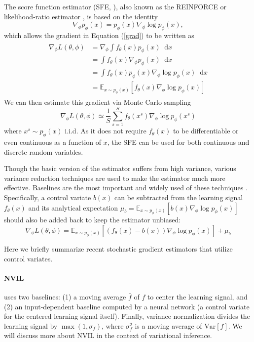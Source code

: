 \documentclass[11pt,a4paper]{article}
\newcommand*\diff{\mathop{}\!\mathrm{d}}
\begin{document}
The score function estimator (SFE, \cite{fu2006gradient}), also known as the REINFORCE \citep{williams1992simple} or likelihood-ratio estimator \citep{glynn1990likelihood}, is based on the identity 
\begin{equation}
    \nabla_\phi p_\phi(x) = p_\phi(x) \nabla_\phi \log p_\phi(x) ,
\end{equation}
which allows the gradient in Equation (\ref{grad}) to be written as 
\begin{align}
\begin{split}
    \nabla_\phi L(\theta, \phi) & = \nabla_\phi \int f_\theta(x) p_\phi(x) \diff x \\
    & = \int f_\theta(x) \nabla_\phi p_\phi(x) \diff x \\
    & = \int f_\theta(x) p_\phi(x) \nabla_\phi \log p_\phi(x) \diff x \\
    & = \mathbb{E}_{x\sim p_\phi(x)}[f_\theta(x) \nabla_\phi \log p_\phi(x)]
\end{split}
\end{align}
We can then estimate this gradient via Monte Carlo sampling
\begin{equation}
    \nabla_\phi L(\theta, \phi) \simeq \frac{1}{S} \sum_{s=1}^{S} f_\theta(x^{s}) \nabla_\phi \log p_\phi(x^{s})
\end{equation}
where $x^{s} \sim p_\phi(x)$ i.i.d. As it does not require $f_\theta(x)$ to be differentiable or even continuous as a function of $x$, the SFE can be used for both continuous and discrete random variables.

Though the basic version of the estimator suffers from high variance, various variance reduction techniques are used to make the estimator much more effective. Baselines are the most important and widely used of these techniques \citep{williams1992simple}. Specifically, a control variate $b(x)$ can be subtracted from the learning signal $f_\theta(x)$ and its analytical expectation $\mu_b = \mathbb{E}_{x\sim p_\phi(x)}[b(x)\nabla_\phi \log p_\phi(x)] $ should also be added back to keep the estimator unbiased:
\begin{equation}
    \nabla_\phi L(\theta, \phi) = \mathbb{E}_{x\sim p_\phi(x)}[(f_\theta(x) - b(x))\nabla_\phi \log p_\phi(x)] + \mu_b 
\end{equation}

Here we briefly summarize recent stochastic gradient estimators that utilize control variates.

\paragraph{NVIL \citep{mnih2014neural}} uses two baselines: (1) a moving average $\bar{f}$ of $f$ to center the learning signal, and (2) an input-dependent baseline computed by a neural network (a control variate for the centered learning signal itself). Finally, variance normalization divides the learning signal by $\max(1,\sigma_f)$, where $\sigma_f^2$ is a moving average of $\text{Var}[f]$. We will discuss more about NVIL in the context of variational inference.
\end{document}
